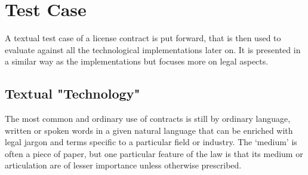 \documentclass{article}
\begin{document}
\section{Test Case}
A textual test case of a license contract is put forward, that is then used to evaluate against all the technological implementations later on. It is presented in a similar way as the implementations but focuses more on legal aspects.
\subsection{Textual "Technology"}
The most common and ordinary use of contracts is still by ordinary language, written or spoken words in a given natural language that can be enriched with legal jargon and terms specific to a particular field or industry. The ‘medium’ is often a piece of paper, but one particular feature of the law is that its medium or articulation are of lesser importance unless otherwise prescribed. %
\end{document}
